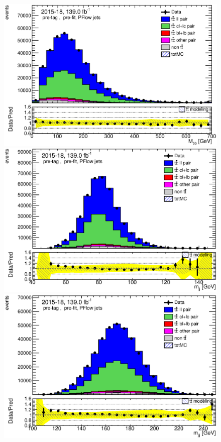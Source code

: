 \documentclass[letterpaper,12pt]{article}
\begin{document}
	\newpage
	\begin{figure}[H]
	\begin{minipage}[b]{.45\textwidth}
	\centering
	\includegraphics[width=1\textwidth]{Oct_distributions/pretagNoRwDL1rwithhighpTPFlow_scaledall/DataMC_Mbb.eps}
	\end{minipage}\hfill
	\begin{minipage}[b]{.45\textwidth}
	\centering
	\includegraphics[width=1\textwidth]{Oct_distributions/pretagNoRwDL1rwithhighpTPFlow_scaledall/DataMC_mjj.eps}
	\end{minipage}
	\begin{minipage}[b]{.45\textwidth}
	\centering
	\includegraphics[width=1\textwidth]{Oct_distributions/pretagNoRwDL1rwithhighpTPFlow_scaledall/DataMC_mjjj.eps}

\end{minipage}
\end{figure}
\end{document}
